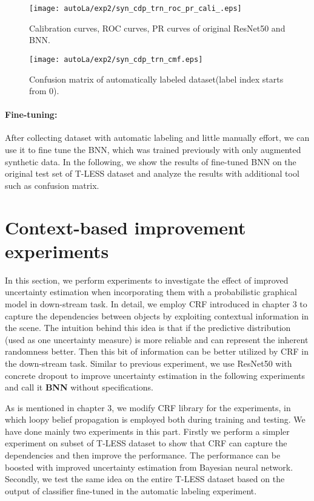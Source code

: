 \begin{figure}[H]
	\begin{center}
		\texttt{[image: autoLa/exp2/syn\_cdp\_trn\_roc\_pr\_cali\_.eps]}
		\caption{Calibration curves, ROC curves, PR curves of original ResNet50 and BNN.}		
		\label{autoLa_exp2_cali}
	\end{center}
\end{figure}


\begin{figure}[H]
	\centering
	\begin{center}
		\texttt{[image: autoLa/exp2/syn\_cdp\_trn\_cmf.eps]}
		\caption{Confusion matrix of automatically labeled dataset(label index starts from 0).}		
		\label{autoLa_exp2_cfm}
	\end{center}
\end{figure}

\paragraph{Fine-tuning:} After collecting dataset with automatic labeling and little manually effort, we can use it to fine tune the BNN, which was trained previously with only augmented synthetic data. In the following, we show the results of fine-tuned BNN on the original test set of T-LESS dataset and analyze the results with additional tool such as confusion matrix.  

\section{Context-based improvement experiments}
In this section, we perform experiments to investigate the effect of improved uncertainty estimation when incorporating them with a probabilistic graphical model in down-stream task. In detail, we employ CRF introduced in chapter 3 to capture the dependencies between objects by exploiting contextual information in the scene. The intuition behind this idea is that if the predictive distribution (used as one uncertainty measure) is more reliable and can represent the inherent randomness better. Then this bit of information can be better utilized by CRF in the down-stream task. Similar to previous experiment, we use ResNet50 with concrete dropout to improve uncertainty estimation in the following experiments and call it \textbf{BNN} without specifications.

As is mentioned in chapter 3, we modify CRF library \cite{Ruiz-Sarmiento-REACTS-2015} for the experiments, in which loopy belief propagation is employed both during training and testing. We have done mainly two experiments in this part. Firstly we perform a simpler experiment on subset of T-LESS dataset to show that CRF can capture the dependencies and then improve the performance. The performance can be boosted with improved uncertainty estimation from Bayesian neural network. Secondly, we test the same idea on the entire T-LESS dataset based on the output of classifier fine-tuned in the automatic labeling experiment. 


